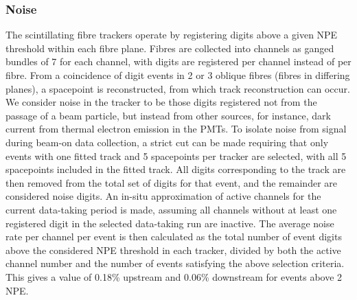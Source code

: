\subsubsection{Noise}
The scintillating fibre trackers operate by registering digits above a given NPE threshold within each fibre plane. Fibres are collected into channels as ganged bundles of 7 for each channel, with digits are registered per channel instead of per fibre. From a coincidence of digit events in 2 or 3 oblique fibres (fibres in differing planes), a spacepoint is reconstructed, from which track reconstruction can occur. We consider noise in the tracker to be those digits registered not from the passage of a beam particle, but instead from other sources, for instance, dark current from thermal electron emission in the PMTs. To isolate noise from signal during beam-on data collection, a strict cut can be made requiring that only events with one fitted track and 5 spacepoints per tracker are selected, with all 5 spacepoints included in the fitted track. All digits corresponding to the track are then removed from the total set of digits for that event, and the remainder are considered noise digits. An in-situ approximation of active channels for the current data-taking period is made, assuming all channels without at least one registered digit in the selected data-taking run are inactive. The average noise rate per channel per event is then calculated as the total number of event digits above the considered NPE threshold in each tracker, divided by both the active channel number and the number of events satisfying the above selection criteria. This gives a value of 0.18\% upstream and 0.06\% downstream for events above 2\,NPE. 

